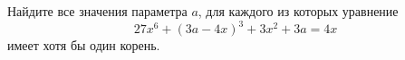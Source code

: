 \begin{ex}
	\begin{condition}
		Найдите все значения параметра \( a \), для каждого из которых уравнение \[ 27x^6+(3a-4x)^3+3x^2+3a=4x \] имеет хотя бы один корень.
	\end{condition}
\end{ex}